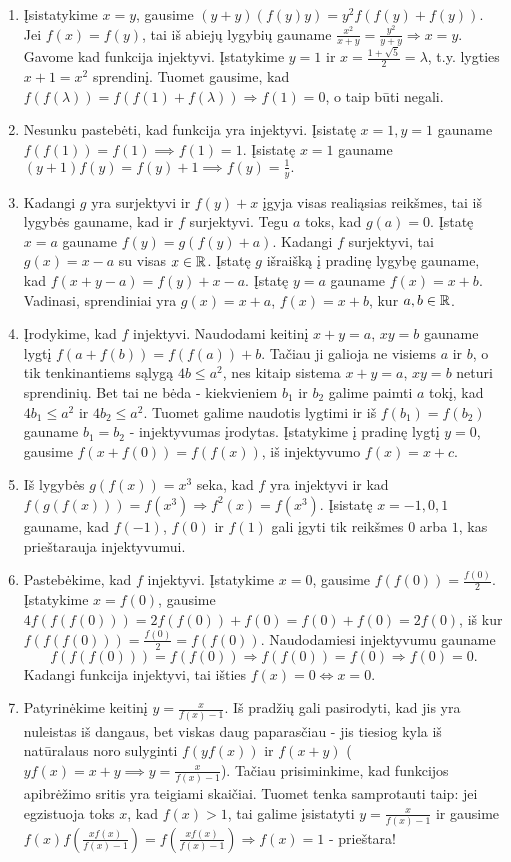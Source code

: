 \begin{enumerate}
\item 
Įsistatykime $x=y$, gausime $(y+y)(f(y)y)=y^2f(f(y)+f(y))$. Jei
$f(x)=f(y)$, tai iš abiejų lygybių gauname $\frac{x^2}{x+y} =
\frac{y^2}{y+y} \Rightarrow x=y$. Gavome kad funkcija injektyvi.
Įstatykime $y=1$ ir $x=\frac{1+\sqrt{5}}{2}=\lambda$, t.y. lygties
$x+1=x^2$ sprendinį. Tuomet gausime, kad
$f(f(\lambda))=f(f(1)+f(\lambda))\Rightarrow f(1)=0$, o taip būti
negali.
\item 
Nesunku pastebėti, kad funkcija yra injektyvi. Įsistatę $x=1,y=1$
gauname $f(f(1))=f(1) \implies f(1)=1$. Įsistatę $x=1$ gauname
$(y+1)f(y)=f(y)+1 \implies f(y)=\frac{1}{y}.$
\item 
Kadangi $g$ yra surjektyvi ir $f(y)+x$ įgyja visas realiąsias reikšmes,
tai iš lygybės gauname, kad ir $f$ surjektyvi. Tegu $a$ toks, kad
$g(a) = 0$. Įstatę $x=a$ gauname $f(y)=g(f(y)+a)$. Kadangi $f$
surjektyvi, tai $g(x)=x-a$ su visas $x\in \mathbb R$. Įstatę $g$ išraišką į
pradinę lygybę gauname, kad $f(x+y-a)=f(y)+x-a$. Įstatę $y=a$ gauname
$f(x)=x+b$. Vadinasi, sprendiniai yra $g(x) =x+a$, $f(x)=x+b$, kur $a,b
\in \mathbb R$.
\item 
Įrodykime, kad $f$ injektyvi. Naudodami keitinį $x+y =a$, $xy =b$
gauname lygtį $f(a+f(b))=f(f(a)) + b$.  Tačiau ji galioja ne visiems
$a$ ir $b$, o tik tenkinantiems sąlygą $4b\leq a^2$, nes kitaip
sistema $x+y =a$, $xy =b$ neturi sprendinių.  Bet tai ne bėda -
kiekvieniem $b_1$ ir $b_2$ galime paimti $a$ tokį, kad $4b_1 \leq a^2$
ir $4b_2 \leq a^2$. Tuomet galime naudotis lygtimi ir iš
$f(b_1)=f(b_2)$ gauname $b_1 = b_2$ - injektyvumas įrodytas.
Įstatykime į pradinę lygtį $y=0$, gausime $f(x + f(0))=f(f(x))$, iš
injektyvumo $f(x)=x+c$.
\item 
Iš lygybės $g(f(x))=x^3$ seka, kad $f$ yra injektyvi ir kad
$f(g(f(x)))=f(x^3)\Rightarrow f^2(x)=f(x^3)$.  Įsistatę $x=-1,0,1$
gauname, kad $f(-1)$, $f(0)$ ir $f(1)$ gali įgyti tik reikšmes $0$
arba $1$, kas prieštarauja injektyvumui.
\item 
Pastebėkime, kad $f$ injektyvi. Įstatykime $x = 0$, gausime
$f(f(0))=\frac{f(0)}{2}$.  Įstatykime $x = f(0)$, gausime $4f(f(f(0)))
= 2f(f(0)) + f(0) = f(0) + f(0) = 2f(0)$, iš kur
$f(f(f(0)))=\frac{f(0)}{2} = f(f(0))$. Naudodamiesi injektyvumu
gauname $$f(f(f(0)))=f(f(0)) \Rightarrow f(f(0)) = f(0) \Rightarrow
f(0) = 0.$$ Kadangi funkcija injektyvi, tai išties $f(x)=0
\Leftrightarrow x=0$.
\item 
Patyrinėkime keitinį $y=\frac{x}{f(x)-1}$. Iš pradžių gali pasirodyti,
kad jis yra nuleistas iš dangaus, bet viskas daug paparasčiau - jis
tiesiog kyla iš natūralaus noro sulyginti $f(yf(x))$ ir $f(x+y)$
($yf(x)=x+y\implies y=\frac{x}{f(x)-1}$). Tačiau prisiminkime, kad
funkcijos apibrėžimo sritis yra teigiami skaičiai. Tuomet tenka
samprotauti taip: jei egzistuoja toks $x$, kad $f(x)>1$, tai galime
įsistatyti $y=\frac{x}{f(x)-1}$ ir gausime
$f(x)f(\frac{xf(x)}{f(x)-1})=f(\frac{xf(x)}{f(x)-1}) \Rightarrow
f(x)=1$ - prieštara!


\end{enumerate}
